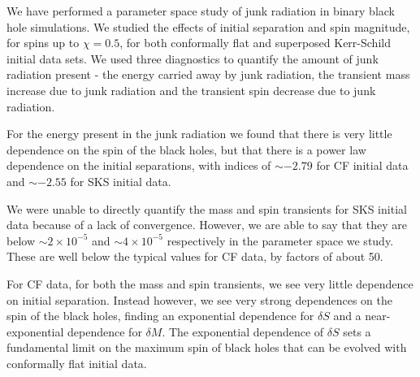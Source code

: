 We have performed a parameter space study of junk radiation in binary
black hole simulations. We studied the effects of initial separation
and spin magnitude, for spins up to $\chi=0.5$, for both conformally flat and superposed
Kerr-Schild initial data sets. We used three diagnostics to quantify
the amount of junk radiation present - the energy carried away by junk
radiation, the transient mass increase due to junk radiation and the
transient spin decrease due to junk radiation.

For the energy present in the junk radiation we found that there is
very little dependence on the spin of the black holes, but that there
is a power law dependence on the initial separations, with indices of
$\sim -2.79$ for CF initial data and $\sim -2.55$ for SKS initial
data.

We were unable to directly quantify the mass and spin transients for
SKS initial data because of a lack of convergence. However, we are
able to say that they are below $\sim 2\times10^{-5}$ and $\sim
4\times10^{-5}$ respectively in the parameter space we study. These
are well below the typical values for CF data, by factors of about 50.

For CF data, for both the mass and spin transients, we see very little
dependence on initial separation. Instead however, we see very strong
dependences on the spin of the black holes, finding an exponential
dependence for $\delta S$ and a near-exponential dependence for
$\delta M$. The exponential dependence of $\delta S$ sets a
fundamental limit on the maximum spin of black holes that can be
evolved with conformally flat initial data.
